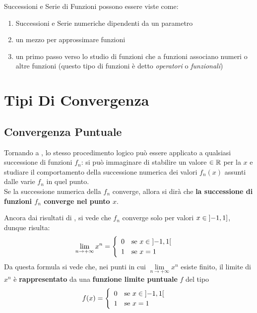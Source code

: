 \begin{observation}
	Successioni e Serie di Funzioni possono essere viste come:
	\begin{enumerate}
		\item Successioni e Serie numeriche dipendenti da un parametro
		\item un mezzo per approssimare funzioni
		\item un primo passo verso lo studio di funzioni che a funzioni associano numeri o altre funzioni (questo tipo di funzioni è detto \textit{operatori} o \textit{funzionali})
	\end{enumerate}
\end{observation}

\newpage
\section{Tipi Di Convergenza}
\subsection{Convergenza Puntuale}\label{sect:conv_punt}
Tornando a , lo stesso procedimento logico può essere applicato a qualsiasi successione di funzioni $f_n$: si può immaginare di stabilire un valore $\in \mathbb{R}$ per la $x$ e studiare il comportamento della successione numerica dei valori $f_n(x)$ assunti dalle varie $f_n$ in quel punto.\\
Se la successione numerica della $f_n$ converge, allora si dirà che \textbf{la successione di funzioni $f_n$ converge nel punto $x$}.

Ancora dai risultati di , si vede che $f_n$ converge solo per valori $x \in \left]-1,1\right]$, dunque risulta:
\[
	\lim\limits_{n \to +\infty} x^n =
	\begin{cases}
		\begin{array}{ll}
			0 & \text{se } x \in \left]-1,1\right[\\
			1 & \text{se } x = 1
		\end{array}
	\end{cases}
\]
Da questa formula si vede che, nei punti in cui $\lim\limits_{n \to +\infty} x^n$ esiste finito, il limite di $x^n$ è \textbf{rappresentato} da una \textbf{funzione limite puntuale} $f$ del tipo
\[
	f(x) =
	\begin{cases}
		\begin{array}{ll}
			0 & \text{se } x \in \left]-1,1\right[\\
			1 & \text{se } x = 1
		\end{array}
	\end{cases}
\]

